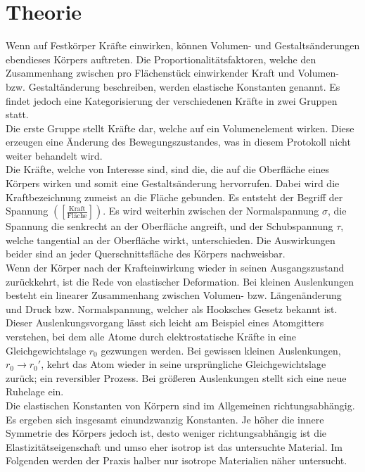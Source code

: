 \section{Theorie}
\label{sec:Theorie}
Wenn auf Festkörper Kräfte einwirken, können Volumen- und Gestaltsänderungen ebendieses Körpers auftreten.
Die Proportionalitätsfaktoren, welche den Zusammenhang zwischen pro Flächenstück einwirkender Kraft und Volumen- bzw. Gestaltänderung beschreiben, werden elastische Konstanten genannt.
Es findet jedoch eine Kategorisierung der verschiedenen Kräfte in zwei Gruppen statt.\\
Die erste Gruppe stellt Kräfte dar, welche auf ein Volumenelement wirken.
Diese erzeugen eine Änderung des Bewegungszustandes, was in diesem Protokoll nicht weiter behandelt wird.\\
Die Kräfte, welche von Interesse sind, sind die, die auf die Oberfläche eines Körpers wirken und somit eine Gestaltsänderung hervorrufen.
Dabei wird die Kraftbezeichnung zumeist an die Fläche gebunden.
Es entsteht der Begriff der Spannung $([\frac{\text{Kraft}}{\text{Fläche}}])$.
Es wird weiterhin zwischen der Normalspannung $\sigma$, die Spannung die senkrecht an der Oberfläche angreift, und der Schubspannung $\tau$, welche tangential an der Oberfläche wirkt, unterschieden.
Die Auswirkungen beider sind an jeder Querschnittsfläche des Körpers nachweisbar.\\
Wenn der Körper nach der Krafteinwirkung wieder in seinen Ausgangszustand zurückkehrt, ist die Rede von elastischer Deformation.
Bei kleinen Auslenkungen besteht ein linearer Zusammenhang zwischen Volumen- bzw. Längenänderung und Druck bzw. Normalspannung, welcher als Hooksches Gesetz bekannt ist.
Dieser Auslenkungsvorgang lässt sich leicht am Beispiel eines Atomgitters verstehen, bei dem alle Atome durch elektrostatische Kräfte in eine Gleichgewichtslage $r_0$ gezwungen werden.
Bei gewissen kleinen Auslenkungen, $r_0 \rightarrow r_0'$, kehrt das Atom wieder in seine ursprüngliche Gleichgewichtslage zurück; ein reversibler Prozess.
Bei größeren Auslenkungen stellt sich eine neue Ruhelage ein.\\
Die elastischen Konstanten von Körpern sind im Allgemeinen richtungsabhängig.
Es ergeben sich insgesamt einundzwanzig Konstanten.
Je höher die innere Symmetrie des Körpers jedoch ist, desto weniger richtungsabhängig ist die Elastizitätseigenschaft und umso eher isotrop ist das untersuchte Material.
Im Folgenden werden der Praxis halber nur isotrope Materialien näher untersucht.\\
